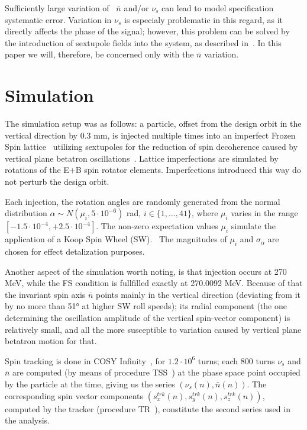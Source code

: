 \documentclass[a4paper]{jacow}
\newcommand{\nbar}{\bar n}
\begin{document}
Sufficiently large variation of~ $\nbar$ and/or $\nu_s$ can lead to model specification systematic error.
Variation in $\nu_s$ is especialy problematic in this regard, as it directly affects the phase of the signal;
however, this problem can be solved by the introduction of sextupole fields into the system,
as described in~\cite{Aksentev:DecohIPAC19}. In this paper we will, therefore, be concerned only with the $\nbar$
variation.

\section{Simulation}
The simulation setup was as follows: a particle, offset from the design orbit in the vertical
direction by 0.3 mm, is injected multiple times into an imperfect
Frozen Spin lattice~\cite{Senichev:Lattices} utilizing sextupoles for
the reduction of spin decoherence caused by vertical plane betatron
oscillations~\cite{Aksentev:DecohIPAC19}. Lattice imperfections are simulated by rotations of the E+B spin
rotator elements. Imperfections introduced this way do not perturb the design orbit.

Each injection, the rotation angles are randomly generated from the
normal distribution $\alpha\sim N(\mu_i, 5\cdot 10^{-6})$ rad, $i\in\{1,\dots,41\}$, where
$\mu_i$ varies in the range $[-1.5\cdot10^{-4}, +2.5\cdot10^{-4}]$. The non-zero expectation values $\mu_i$
simulate the application of a Koop Spin Wheel (SW).~\cite{Koop:SW} The magnitudes of $\mu_i$ and $\sigma_{\alpha}$
are chosen for effect detalization purposes.

Another aspect of the simulation worth noting, is that injection occurs at 270 MeV, while the FS condition
is fullfilled exactly at 270.0092 MeV. Because of that the invariant spin axis $\nbar$
points mainly in the vertical direction (deviating from it by no more than \ang{51} at higher SW roll speeds);
its radial component (the one determining the oscillation amplitude of the vertical spin-vector component)
is relatively small, and all the more susceptible to variation caused by vertical plane betatron motion for that. 

Spin tracking is done in COSY Infinity~\cite{COSYINF:Website}, for $1.2\cdot10^6$ turns; each 800 turns
$\nu_s$ and $\nbar$ are computed (by means of procedure TSS~\cite[p.~41]{COSYINF:BeamPhysMan}) at
the phase space point occupied by the particle at the time, giving us the series $(\nu_s(n), \nbar(n))$.
The corresponding spin vector components $(s_x^{trk}(n), s_y^{trk}(n), s_z^{trk}(n))$,
computed by the tracker (procedure
TR~\cite[p.~41]{COSYINF:BeamPhysMan}), 
constitute the second series used in the analysis.
\end{document}
